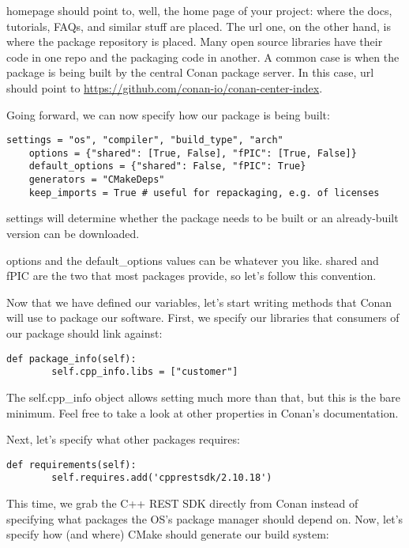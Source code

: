 homepage should point to, well, the home page of your project: where the docs, tutorials, FAQs, and similar stuff are placed. The url one, on the other hand, is where the package repository is placed. Many open source libraries have their code in one repo and the packaging code in another. A common case is when the package is being built by the central Conan package server. In this case, url should point to \url{https://github.com/conan-io/conan-center-index}.

Going forward, we can now specify how our package is being built:

\begin{lstlisting}[style=stylePython]
	settings = "os", "compiler", "build_type", "arch"
	options = {"shared": [True, False], "fPIC": [True, False]}
	default_options = {"shared": False, "fPIC": True}
	generators = "CMakeDeps"
	keep_imports = True # useful for repackaging, e.g. of licenses
\end{lstlisting}

settings will determine whether the package needs to be built or an already-built version can be downloaded. 

options and the default\_options values can be whatever you like. shared and fPIC are the two that most packages provide, so let's follow this convention.

Now that we have defined our variables, let's start writing methods that Conan will use to package our software. First, we specify our libraries that consumers of our package should link against:

\begin{lstlisting}[style=stylePython]
	def package_info(self):
		self.cpp_info.libs = ["customer"]
\end{lstlisting}

The self.cpp\_info object allows setting much more than that, but this is the bare minimum. Feel free to take a look at other properties in Conan's documentation.

Next, let's specify what other packages requires:

\begin{lstlisting}[style=stylePython]
	def requirements(self):
		self.requires.add('cpprestsdk/2.10.18')
\end{lstlisting}

This time, we grab the C++ REST SDK directly from Conan instead of specifying what packages the OS's package manager should depend on. Now, let's specify how (and where) CMake should generate our build system:

